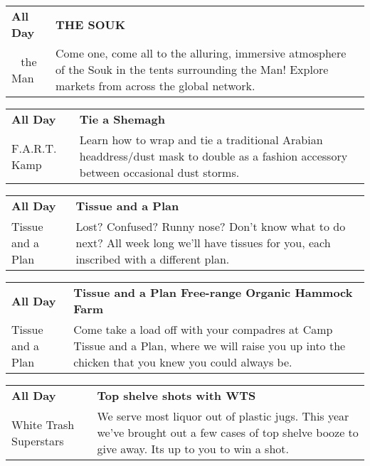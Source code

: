 \begin{tabular}{ p{1in} p{2.2in} }
    \textbf{All Day} & \textbf{THE SOUK} \\
    ~ \newline the Man & Come one, come all to the alluring, immersive atmosphere of the Souk in the tents surrounding the Man! Explore markets from across the global network. \\
    \hline 
\end{tabular}
    
\begin{tabular}{ p{1in} p{2.2in} }
    \textbf{All Day} & \textbf{Tie a Shemagh} \\
    F.A.R.T. Kamp \newline  & Learn how to wrap and tie a traditional Arabian headdress/dust mask to double as a fashion accessory between occasional dust storms. \\
    \hline 
\end{tabular}
    
\begin{tabular}{ p{1in} p{2.2in} }
    \textbf{All Day} & \textbf{Tissue and a Plan} \\
    Tissue and a Plan \newline  & Lost? Confused? Runny nose? Don't know what to do next? All week long we'll have tissues for you, each inscribed with a different plan. \\
    \hline 
\end{tabular}
    
\begin{tabular}{ p{1in} p{2.2in} }
    \textbf{All Day} & \textbf{Tissue and a Plan Free-range Organic Hammock Farm} \\
    Tissue and a Plan \newline  & Come take a load off with your compadres at Camp Tissue and a Plan, where we will raise you up into the chicken that you knew you could always be. \\
    \hline 
\end{tabular}
    
\begin{tabular}{ p{1in} p{2.2in} }
    \textbf{All Day} & \textbf{Top shelve shots with WTS} \\
    White Trash Superstars \newline  & We serve most liquor out of plastic jugs. This year we've brought out a few cases of top shelve booze to give away. Its up to you to win a shot. \\
    \hline 
\end{tabular}
    
